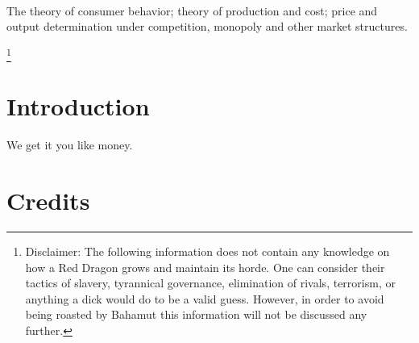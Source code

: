 \documentclass[letterpaper,10pt,twoside,twocolumn,openany]{book}
\begin{document}

\frontmatter                            %


\begin{titlepage}
    \begin{center}
      ~      
        \newpage

        \large
        \vspace*{\fill}
        The theory of consumer behavior; theory of production and cost; price and output determination under competition, monopoly and other market structures.
        \vspace*{\fill}

    \end{center}
    \let\thefootnote\relax\footnote{Disclaimer: The following information does not contain any knowledge on how a Red Dragon grows and maintain its horde. One can consider their tactics of slavery, tyrannical governance, elimination of rivals, terrorism, or anything a dick would do to be a valid guess. However, in order to avoid being roasted by Bahamut this information will not be discussed any further.}
 \end{titlepage} 


\tableofcontents                        %
\mainmatter                             %
\chapter{Introduction}
We get it you like money.














\chapter{Credits}
\end{document}

